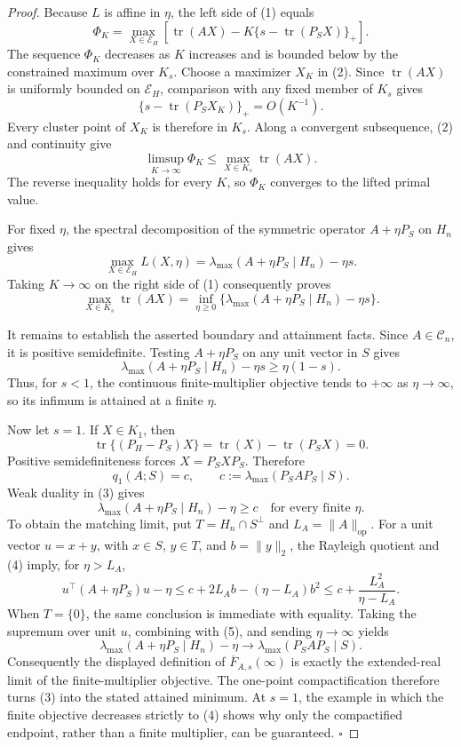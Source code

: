 \documentclass{article}
\begin{document}
\begin{proof}
Because \(L\) is affine in \(\eta\), the left side of (1) equals
\[
\Phi_K
=\max_{X\in\mathcal E_H}
\left[\operatorname{tr}(AX)-K\{s-\operatorname{tr}(P_SX)\}_+\right].
\tag{2}
\]
The sequence \(\Phi_K\) decreases as \(K\) increases and is bounded below by the constrained maximum over \(K_s\). Choose a maximizer \(X_K\) in (2). Since \(\operatorname{tr}(AX)\) is uniformly bounded on \(\mathcal E_H\), comparison with any fixed member of \(K_s\) gives
\[
\{s-\operatorname{tr}(P_SX_K)\}_+=O(K^{-1}).
\]
Every cluster point of \(X_K\) is therefore in \(K_s\). Along a convergent subsequence, (2) and continuity give
\[
\limsup_{K\to\infty}\Phi_K
\leq\max_{X\in K_s}\operatorname{tr}(AX).
\]
The reverse inequality holds for every \(K\), so \(\Phi_K\) converges to the lifted primal value.

For fixed \(\eta\), the spectral decomposition of the symmetric operator \(A+\eta P_S\) on \(H_n\) gives
\[
\max_{X\in\mathcal E_H}L(X,\eta)
=\lambda_{\max}(A+\eta P_S\mid H_n)-\eta s.
\]
Taking \(K\to\infty\) on the right side of (1) consequently proves
\[
\max_{X\in K_s}\operatorname{tr}(AX)
=\inf_{\eta\geq0}
\{\lambda_{\max}(A+\eta P_S\mid H_n)-\eta s\}.
\tag{3}
\]

It remains to establish the asserted boundary and attainment facts. Since \(A\in\mathcal C_n\), it is positive semidefinite. Testing \(A+\eta P_S\) on any unit vector in \(S\) gives
\[
\lambda_{\max}(A+\eta P_S\mid H_n)-\eta s
\geq\eta(1-s).
\]
Thus, for \(s<1\), the continuous finite-multiplier objective tends to \(+\infty\) as \(\eta\to\infty\), so its infimum is attained at a finite \(\eta\).

Now let \(s=1\). If \(X\in K_1\), then
\[
\operatorname{tr}\{(P_H-P_S)X\}
=\operatorname{tr}(X)-\operatorname{tr}(P_SX)=0.
\]
Positive semidefiniteness forces \(X=P_SXP_S\). Therefore
\[
q_1(A;S)=c,
\qquad
c:=\lambda_{\max}(P_SAP_S\mid S).
\tag{4}
\]
Weak duality in (3) gives
\[
\lambda_{\max}(A+\eta P_S\mid H_n)-\eta\geq c
\quad\text{for every finite }\eta.
\tag{5}
\]
To obtain the matching limit, put \(T=H_n\cap S^\perp\) and \(L_A=\|A\|_{\mathrm{op}}\). For a unit vector \(u=x+y\), with \(x\in S\), \(y\in T\), and \(b=\|y\|_2\), the Rayleigh quotient and (4) imply, for \(\eta>L_A\),
\[
u^\top(A+\eta P_S)u-\eta
\leq c+2L_Ab-(\eta-L_A)b^2
\leq c+\frac{L_A^2}{\eta-L_A}.
\]
When \(T=\{0\}\), the same conclusion is immediate with equality. Taking the supremum over unit \(u\), combining with (5), and sending \(\eta\to\infty\) yields
\[
\lambda_{\max}(A+\eta P_S\mid H_n)-\eta
\longrightarrow\lambda_{\max}(P_SAP_S\mid S).
\]
Consequently the displayed definition of \(\overline F_{A,s}(\infty)\) is exactly the extended-real limit of the finite-multiplier objective. The one-point compactification therefore turns (3) into the stated attained minimum. At \(s=1\), the example in which the finite objective decreases strictly to (4) shows why only the compactified endpoint, rather than a finite multiplier, can be guaranteed. \(\square\)
\end{proof}
\end{document}
